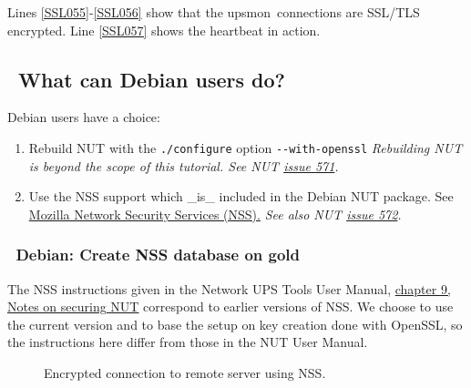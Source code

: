 \documentclass[12pt]{article}
\newlength{\headersep}\setlength{\headersep}{3mm}
\newcommand{\Hsep}{\hspace{\headersep}}
\newcommand{\newcolumn}{\vfill\eject}
\newcommand{\upsmon}{\mbox{\textcolor{MONCOLOUR}{upsmon}}}
\newcommand{\ol}{\begin{enumerate}%
   \setlength{\itemsep}{0em}}
\newcommand{\eol}{\end{enumerate}}
\newcommand{\li}{\item}                 %
\begin{document}
Lines \ref{SSL055}-\ref{SSL056} show that the \upsmon\ connections are SSL/TLS encrypted.
Line \ref{SSL057} shows the heartbeat in action.

\clearpage
\subsection{\Hsep\ What can Debian users do?}\label{section:Debianusers}

Debian users have a choice:

\ol

\li Rebuild NUT with the \texttt{./configure} option
\texttt{-\/-with-openssl} \textit{Rebuilding NUT is beyond the scope of
  this tutorial.  See NUT
  \href{https://github.com/networkupstools/nut/issues/571}%
       {issue 571}.}

\li Use the NSS support which \_is\_ included in the Debian NUT
package.  See
\href{https://developer.mozilla.org/en-US/docs/Mozilla/Projects/NSS}%
     {Mozilla Network Security Services (NSS).}
\textit{See also NUT
       \href{https://github.com/networkupstools/nut/issues/572}%
            {issue 572}.}

\eol

\subsubsection{\Hsep\ Debian: Create NSS database on gold}\label{section:NSS.create.gold}

The NSS instructions given in the Network UPS Tools User Manual,
\href{https://networkupstools.org/docs/user-manual.chunked/ar01s09.html}%
     {chapter 9, Notes on securing NUT} correspond to earlier versions
     of NSS.  We choose to use the current version and to base the
     setup on key creation done with OpenSSL, so the instructions here
     differ from those in the NUT User Manual.
     
\begin{figure}[ht]
\begin{center}
\end{center}
\vspace{-6mm}
\caption{Encrypted connection to remote server using NSS.\label{fig:NSS}}
\end{figure}
\end{document}
